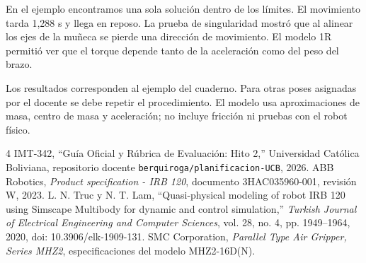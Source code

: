\documentclass[conference]{IEEEtran}
\begin{document}
En el ejemplo encontramos una sola solución dentro de los límites. El movimiento tarda 1,288 s y llega en reposo. La prueba de singularidad mostró que al alinear los ejes de la muñeca se pierde una dirección de movimiento. El modelo 1R permitió ver que el torque depende tanto de la aceleración como del peso del brazo.

Los resultados corresponden al ejemplo del cuaderno. Para otras poses asignadas por el docente se debe repetir el procedimiento. El modelo usa aproximaciones de masa, centro de masa y aceleración; no incluye fricción ni pruebas con el robot físico.

\begin{thebibliography}{4}
 IMT-342, ``Guía Oficial y Rúbrica de Evaluación: Hito 2,'' Universidad Católica Boliviana, repositorio docente \texttt{berquiroga/planificacion-UCB}, 2026.
 ABB Robotics, \emph{Product specification - IRB 120}, documento 3HAC035960-001, revisión W, 2023.
 L. N. Truc y N. T. Lam, ``Quasi-physical modeling of robot IRB 120 using Simscape Multibody for dynamic and control simulation,'' \emph{Turkish Journal of Electrical Engineering and Computer Sciences}, vol. 28, no. 4, pp. 1949--1964, 2020, doi: 10.3906/elk-1909-131.
 SMC Corporation, \emph{Parallel Type Air Gripper, Series MHZ2}, especificaciones del modelo MHZ2-16D(N).
\end{thebibliography}
\end{document}
